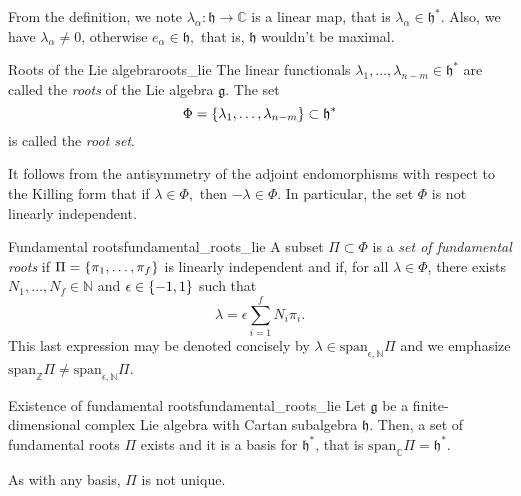 From the definition, we note \(\lambda_{\alpha} : \mathfrak{h} \to \mathbb{C}\) is a linear map, that is \(\lambda_{\alpha} \in \mathfrak{h}^{\ast}\). Also, we have \(\lambda_{\alpha} \neq 0\), otherwise \(e_{\alpha} \in \mathfrak{h},\) that is, \(\mathfrak{h}\) wouldn't be maximal. \todo %

\begin{definition}{Roots of the Lie algebra}{roots_lie}
    The linear functionals \(\lambda_1, \dots, \lambda_{n-m} \in \mathfrak{h}^{\ast}\) are called the \emph{roots} of the Lie algebra \(\mathfrak{g}\). The set
    \begin{equation*}
        \Phi = \{\lambda_1, \dots, \lambda_{n-m}\} \subset \mathfrak{h}^{\ast}
    \end{equation*}
    is called the \emph{root set}.
\end{definition}
\begin{remark}
    \todo %
    It follows from the antisymmetry of the adjoint endomorphisms with respect to the Killing form that if \(\lambda \in \Phi,\) then \(-\lambda \in \Phi\). In particular, the set \(\Phi\) is not linearly independent.
\end{remark}

\begin{definition}{Fundamental roots}{fundamental_roots_lie}
    A subset \(\Pi \subset \Phi\) is a \emph{set of fundamental roots} if \(\Pi = \{\pi_1, \dots, \pi_f\}\) is linearly independent and if, for all \(\lambda \in \Phi\), there exists \(N_1, \dots, N_f \in \mathbb{N}\) and \(\epsilon \in \{-1, 1\}\) such that
    \begin{equation*}
        \lambda = \epsilon \sum_{i=1}^f N_i \pi_i.
    \end{equation*}
    This last expression may be denoted concisely by \(\lambda \in \mathrm{span}_{\epsilon,\mathbb{N}}\Pi\) and we emphasize \(\mathrm{span}_{\mathbb{Z}}\Pi \neq \mathrm{span}_{\epsilon, \mathbb{N}}\Pi\).
\end{definition}

\begin{theorem}{Existence of fundamental roots}{fundamental_roots_lie}
    Let \(\mathfrak{g}\) be a finite-dimensional complex Lie algebra with Cartan subalgebra \(\mathfrak{h}\). Then, a set of fundamental roots \(\Pi\) exists and it is a basis for \(\mathfrak{h}^{\ast}\), that is \(\mathrm{span}_{\mathbb{C}}\Pi = \mathfrak{h}^{\ast}.\)
\end{theorem}
\begin{remark}
    As with any basis, \(\Pi\) is not unique.
\end{remark}

